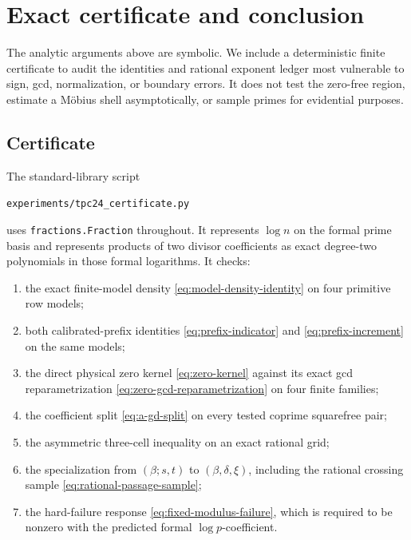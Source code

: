 \section{Exact certificate and conclusion}
\label{sec:certificate-conclusion}

The analytic arguments above are symbolic.  We include a deterministic
finite certificate to audit the identities and rational exponent
ledger most vulnerable to sign, gcd, normalization, or boundary
errors.  It does not test the zero-free region, estimate a M\"obius
shell asymptotically, or sample primes for evidential purposes.

\subsection{Certificate}

The standard-library script
\begin{center}
 \texttt{experiments/tpc24\_certificate.py}
\end{center}
uses \texttt{fractions.Fraction} throughout.  It represents
\(\log n\) on the formal prime basis and represents products of two
divisor coefficients as exact degree-two polynomials in those formal
logarithms.  It checks:
\begin{enumerate}[label=\textup{(\arabic*)}]
 \item the exact finite-model density
 \eqref{eq:model-density-identity} on four primitive row models;
 \item both calibrated-prefix identities
 \eqref{eq:prefix-indicator} and \eqref{eq:prefix-increment} on the
 same models;
 \item the direct physical zero kernel
 \eqref{eq:zero-kernel} against its exact gcd reparametrization
 \eqref{eq:zero-gcd-reparametrization} on four finite families;
 \item the coefficient split \eqref{eq:a-gd-split} on every tested
 coprime squarefree pair;
 \item the asymmetric three-cell inequality on an exact rational grid;
 \item the specialization from \((\beta;s,t)\) to
 \((\beta,\delta,\xi)\), including the rational crossing sample
 \eqref{eq:rational-passage-sample};
 \item the hard-failure response \eqref{eq:fixed-modulus-failure},
 which is required to be nonzero with the predicted formal
 \(\log p\)-coefficient.
\end{enumerate}

